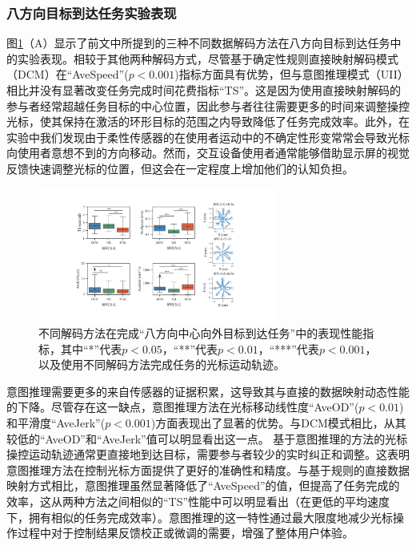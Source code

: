 \subsubsection{八方向目标到达任务实验表现}图\ref{fig:3-11}（A）显示了前文中所提到的三种不同数据解码方法在八方向目标到达任务中的实验表现。相较于其他两种解码方式，尽管基于确定性规则直接映射解码模式（DCM）在``AveSpeed''($p<0.001$)指标方面具有优势，但与意图推理模式（UII）相比并没有显著改变任务完成时间花费指标``TS''。这是因为使用直接映射解码的参与者经常超越任务目标的中心位置，因此参与者往往需要更多的时间来调整操控光标，使其保持在激活的环形目标的范围之内导致降低了任务完成效率。此外，在实验中我们发现由于柔性传感器的在使用者运动中的不确定性形变常常会导致光标向使用者意想不到的方向移动。然而，交互设备使用者通常能够借助显示屏的视觉反馈快速调整光标的位置，但这会在一定程度上增加他们的认知负担。  
\begin{figure}[htb]
    \centering
    \includegraphics[width=0.7\textwidth]{figures/3-Fig-11.pdf}
    \caption{不同解码方法在完成``八方向中心向外目标到达任务''中的表现性能指标，其中“*”代表$p<0.05$，“**”代表$p<0.01$，“***”代表$p<0.001$，以及使用不同解码方法完成任务的光标运动轨迹。}
    \label{fig:3-11}
\end{figure}     
   
意图推理需要更多的来自传感器的证据积累，这导致其与直接的数据映射动态性能的下降。尽管存在这一缺点，意图推理方法在光标移动线性度``AveOD''($p<0.01$)和平滑度``AveJerk''($p<0.001$)方面表现出了显著的优势。与DCM模式相比，从其较低的``AveOD''和``AveJerk''值可以明显看出这一点。 基于意图推理的方法的光标操控运动轨迹通常更直接地到达目标，需要参与者较少的实时纠正和调整。这表明意图推理方法在控制光标方面提供了更好的准确性和精度。与基于规则的直接数据映射方式相比，意图推理虽然显著降低了``AveSpeed''的值，但提高了任务完成的效率，这从两种方法之间相似的“TS”性能中可以明显看出（在更低的平均速度下，拥有相似的任务完成效率）。意图推理的这一特性通过最大限度地减少光标操作过程中对于控制结果反馈校正或微调的需要，增强了整体用户体验。

